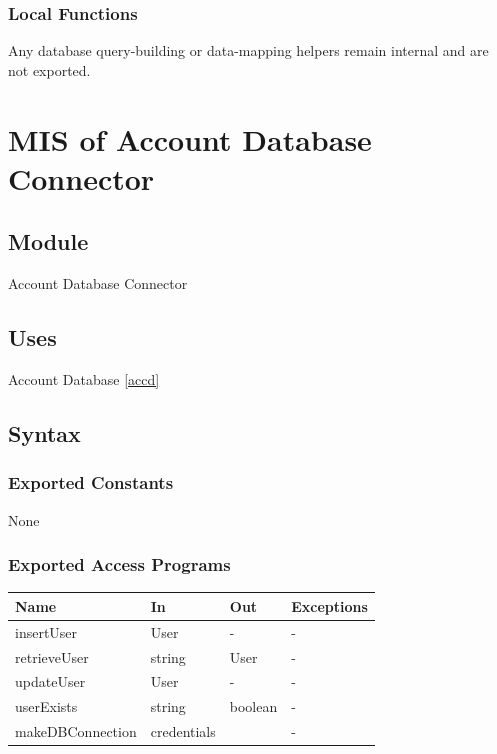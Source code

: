 \documentclass[12pt, titlepage]{article}
\begin{document}
    \subsubsection{Local Functions}
        Any database query-building or data-mapping helpers remain internal and are not exported.




\section{MIS of Account Database Connector} \label{accdc}

\subsection{Module}

Account Database Connector

\subsection{Uses}

Account Database \ref{accd}

\subsection{Syntax}

\subsubsection{Exported Constants}
None
\subsubsection{Exported Access Programs}

\begin{center}
\begin{tabular}{p{2cm} p{4cm} p{4cm} p{2cm}}
\hline
\textbf{Name} & \textbf{In} & \textbf{Out} & \textbf{Exceptions} \\
\hline
insertUser & User & - & - \\
retrieveUser & string & User & - \\
updateUser & User & - & - \\
userExists & string & boolean & - \\
makeDBConnection & credentials & & - \\
\hline
\end{tabular}
\end{center}
\end{document}
